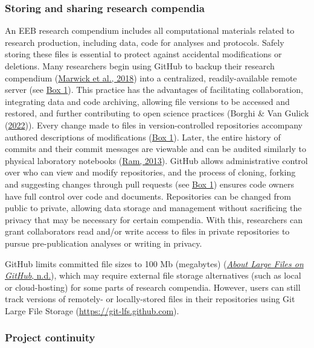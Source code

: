 \hypertarget{storing-and-sharing-research-compendia}{%
\subsubsection{Storing and sharing research compendia}\label{storing-and-sharing-research-compendia}}

An EEB research compendium includes all computational materials related to research production, including data, code for analyses and protocols.
Safely storing these files is essential to protect against accidental modifications or deletions.
Many researchers begin using GitHub to backup their research compendium (\protect\hyperlink{ref-MwwMapRG}{Marwick et al., 2018}) into a centralized, readily-available remote server (see \protect\hyperlink{definitions}{Box 1}).
This practice has the advantages of facilitating collaboration, integrating data and code archiving, allowing file versions to be accessed and restored, and further contributing to open science practices (Borghi \& Van Gulick (\protect\hyperlink{ref-gLby7jt1}{2022})).
Every change made to files in version-controlled repositories accompany authored descriptions of modifications (\protect\hyperlink{definitions}{Box 1}).
Later, the entire history of commits and their commit messages are viewable and can be audited similarly to physical laboratory notebooks (\protect\hyperlink{ref-4ny1onB0}{Ram, 2013}).
GitHub allows administrative control over who can view and modify repositories, and the process of cloning, forking and suggesting changes through pull requests (see \protect\hyperlink{definitions}{Box 1}) ensures code owners have full control over code and documents.
Repositories can be changed from public to private, allowing data storage and management without sacrificing the privacy that may be necessary for certain compendia.
With this, researchers can grant collaborators read and/or write access to files in private repositories to pursue pre-publication analyses or writing in privacy.

GitHub limits committed file sizes to 100 Mb (megabytes) (\protect\hyperlink{ref-1Co6ZZjF1}{\emph{About Large Files on GitHub}, n.d.}), which may require external file storage alternatives (such as local or cloud-hosting) for some parts of research compendia.
However, users can still track versions of remotely- or locally-stored files in their repositories using Git Large File Storage (\url{https://git-lfs.github.com}).

\hypertarget{project-continuity}{%
\subsubsection{Project continuity}\label{project-continuity}}

